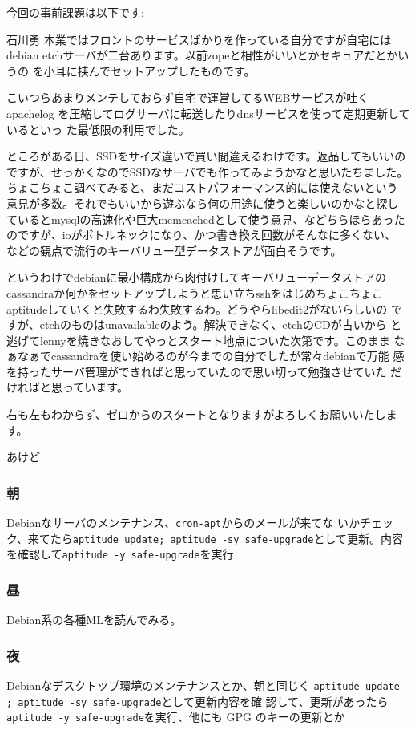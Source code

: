 今回の事前課題は以下です:

\begin{prework}{ 石川勇 }
 本業ではフロントのサービスばかりを作っている自分ですが自宅にはdebian
 etchサーバが二台あります。以前zopeと相性がいいとかセキュアだとかいうの
 を小耳に挟んでセットアップしたものです。

 こいつらあまりメンテしておらず自宅で運営してるWEBサービスが吐くapachelog
 を圧縮してログサーバに転送したりdnsサービスを使って定期更新しているといっ
 た最低限の利用でした。


 ところがある日、SSDをサイズ違いで買い間違えるわけです。返品してもいいの
 ですが、せっかくなのでSSDなサーバでも作ってみようかなと思いたちました。
 ちょこちょこ調べてみると、まだコストパフォーマンス的には使えないという
 意見が多数。それでもいいから遊ぶなら何の用途に使うと楽しいのかなと探し
 ているとmysqlの高速化や巨大memcachedとして使う意見、などちらほらあった
 のですが、ioがボトルネックになり、かつ書き換え回数がそんなに多くない、
 などの観点で流行のキーバリュー型データストアが面白そうです。

 というわけでdebianに最小構成から肉付けしてキーバリューデータストアの
 cassandraか何かをセットアップしようと思い立ちsshをはじめちょこちょこ
 aptitudeしていくと失敗するわ失敗するわ。どうやらlibedit2がないらしいの
 ですが、etchのものはunavailableのよう。解決できなく、etchのCDが古いから
 と逃げてlennyを焼きなおしてやっとスタート地点についた次第です。このまま
 なぁなぁでcassandraを使い始めるのが今までの自分でしたが常々debianで万能
 感を持ったサーバ管理ができればと思っていたので思い切って勉強させていた
 だければと思っています。

 右も左もわからず、ゼロからのスタートとなりますがよろしくお願いいたします。
\end{prework}

\begin{prework}{ あけど }
\subsubsection{朝}
Debianなサーバのメンテナンス、\texttt{cron-apt}からのメールが来てな
 いかチェック、来てたら\texttt{aptitude update; aptitude -sy
 safe-upgrade}として更新。内容を確認して\texttt{aptitude -y
 safe-upgrade}を実行

\subsubsection{昼}
Debian系の各種MLを読んでみる。

\subsubsection{夜}
Debianなデスクトップ環境のメンテナンスとか、朝と同じく
 \texttt{aptitude update ; aptitude -sy safe-upgrade}として更新内容を確
 認して、更新があったら\texttt{aptitude -y safe-upgrade}を実行、他にも
 GPG のキーの更新とか
\end{prework}

